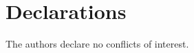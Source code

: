 \documentclass[a4paper,twoside]{article}
\begin{document}
\section*{Declarations}
The authors declare no conflicts of interest.

\end{document}
